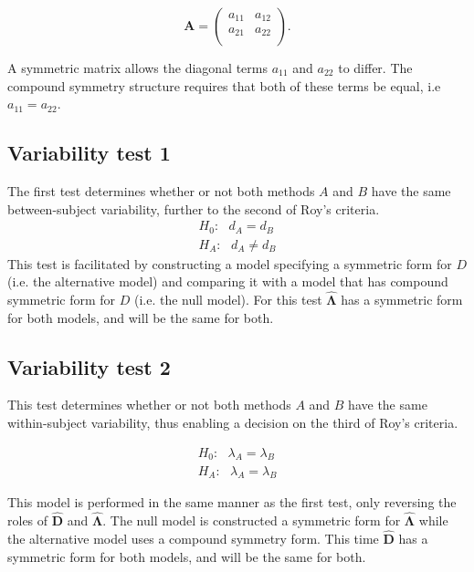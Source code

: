 \documentclass[12pt, a4paper]{report}
\theoremstyle{plain}
\theoremstyle{definition}
\theoremstyle{remark}
\begin{document}
\[
\boldsymbol{A} = \left( \begin{array}{cc}
a_{11} & a_{12}  \\
a_{21} & a_{22}  \\
\end{array}\right).
\]



A symmetric matrix allows the diagonal terms $a_{11}$ and $a_{22}$ to differ. The compound symmetry structure requires that both of these terms be equal, i.e $a_{11} = a_{22}$.




\subsection{Variability test 1}
The first test determines whether or not both methods $A$ and $B$ have the same between-subject variability, further to the second of Roy's criteria.
\begin{eqnarray*}
	H_{0}: \mbox{ }d_{A}  = d_{B} \\
	H_{A}: \mbox{ }d_{A}  \neq d_{B}
\end{eqnarray*}
This test is facilitated by constructing a model specifying a symmetric form for $D$ (i.e. the alternative model) and comparing it with a model that has compound symmetric form for $D$ (i.e. the null model). For this test $\boldsymbol{\hat{\Lambda}}$ has a symmetric form for both models, and will be the same for both.



\subsection{Variability test 2}

This test determines whether or not both methods $A$ and $B$ have the same within-subject variability, thus enabling a decision on the third of Roy's criteria.

\begin{eqnarray*}
	H_{0}: \mbox{ }\lambda_{A}  = \lambda_{B} \\
	H_{A}: \mbox{ }\lambda_{A}  = \lambda_{B}
\end{eqnarray*}

This model is performed in the same manner as the first test, only reversing the roles of $\boldsymbol{\hat{D}}$ and $\boldsymbol{\hat{\Lambda}}$. The null model is constructed a symmetric form for $\boldsymbol{\hat{\Lambda}}$ while the alternative model uses a compound symmetry form. This time $\boldsymbol{\hat{D}}$ has a symmetric form for both models, and will be the same for both.
\end{document}
